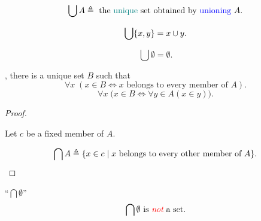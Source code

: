 
\begin{frame}{}
  \begin{definition}
    \[
      \bigcup A \triangleq \text{ the \textcolor{teal}{unique} set obtained by \textcolor{blue}{unioning} } A.
    \]
  \end{definition}

  \pause
  \begin{theorem}
    \[
      \bigcup \{x, y\} = x \cup y.
    \]
  \end{theorem}

  \pause
  \begin{theorem}
    \[
      \bigcup \emptyset = \emptyset.
    \]
  \end{theorem}
\end{frame}

\begin{frame}{}
  \begin{theorem}
    , there is a unique set $B$ such that
    \[
      \forall x\; (x \in B \iff x \text{ belongs to every member of } A).
    \]
    \[
      \forall x\; \big(x \in B \iff \forall y \in A (x \in y) \big).
    \]
  \end{theorem}

  \pause
  \begin{proof}
    \begin{center}
      Let $c$ be a fixed member of $A$.
    \end{center}

    \pause
    \vspace{-0.50cm}
    \[
      \bigcap A \triangleq \{x \in c \mid x \text{ belongs to every other member of } A\}.
    \]
  \end{proof}

  \pause
  \begin{alertblock}{``$\bigcap \emptyset$''}
    \[
      \bigcap \emptyset \text{ is \textcolor{red}{\it not} a set}.
    \]
  \end{alertblock}
\end{frame}

